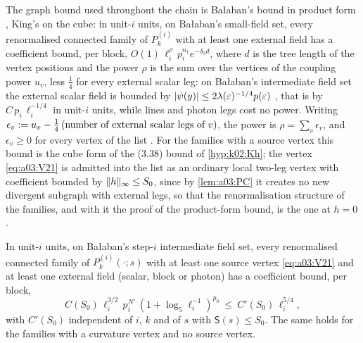 The graph bound used throughout the chain is Ba{\l}aban's bound in product form \cite[Prop.~1, (1.33)]{Ba3}, King's \cite[Thm.~3.5, (3.38)]{K1} on the cube: in unit-$i$ units, on Ba{\l}aban's small-field set, every renormalised connected family of $P^{(i)}_k$ with at least one external field has a coefficient bound, per block, $O(1)\,\ell_i^{\rho}\,p_i^{n_1}e^{-\delta_0d}$, where $d$ is the tree length of the vertex positions and the power $\rho$ is the sum over the vertices of the coupling power $u_v$, less $\frac14$ for every external scalar leg: on Ba{\l}aban's intermediate field set the external scalar field is bounded by $|\psi(y)|\le2\lambda(\varepsilon)^{-1/4}p(\varepsilon)$ \cite[p.~559]{Ba2}, that is by $C\,p_i\,\ell_i^{-1/4}$ in unit-$i$ units, while lines and photon legs cost no power. Writing $\epsilon_v:= u_v-\frac14\,(\text{number of external scalar legs of }v)$, the power is $\rho=\sum_v\epsilon_v$, and $\epsilon_v\ge0$ for every vertex of the list \cite[(1.6)--(1.15)]{Ba3}. For the families with a source vertex this bound is the cube form of the (3.38) bound of \cref{hyp:k02:Kh}; the vertex \eqref{eq:a03:V21} is admitted into the list as an ordinary local two-leg vertex with coefficient bounded by $\lVert h\rVert_\infty\le S_0$, since by \cref{lem:a03:PC} it creates no new divergent subgraph with external legs, so that the renormalisation structure of the families, and with it the proof of the product-form bound, is the one at $h=0$.

\begin{lemma}\label{lem:a03:D}
In unit-$i$ units, on Ba{\l}aban's step-$i$ intermediate field set, every renormalised connected family of $P^{(i)}_k(\cdot;s)$ with at least one source vertex \eqref{eq:a03:V21} and at least one external field (scalar, block or photon) has a coefficient bound, per block,
\[
C(S_0)\,\ell_i^{3/2}\,p_i^{N'}\,(1+\log_5\ell_i^{-1})^{p_0}\ \le\ C'(S_0)\,\ell_i^{5/4},
\]
with $C'(S_0)$ independent of $i$, $k$ and of $s$ with $\mathsf S(s)\le S_0$. The same holds for the families with a curvature vertex and no source vertex.
\end{lemma}

